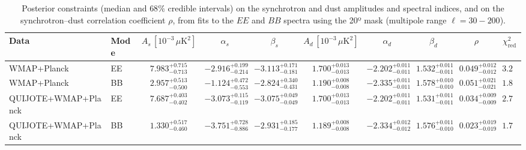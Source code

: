 \begin{table}[h]
\centering
\scriptsize
\setlength{\tabcolsep}{4pt}
\caption{Posterior constraints (median and $68\%$ credible intervals) on the synchrotron and dust amplitudes and spectral indices, and on the synchrotron--dust correlation coefficient $\rho$, from fits to the $EE$ and $BB$ spectra using the 20º mask (multipole range $\ell=30-200$).}
\label{tab:fit_results}
\begin{tabular}{llcccccccc}
\toprule
Data & Mode & $A_s\,[10^{-3}\,\mu\mathrm{K}^2]$ & $\alpha_s$ & $\beta_s$ & $A_d\,[10^{-3}\,\mu\mathrm{K}^2]$ & $\alpha_d$ & $\beta_d$ & $\rho$ & $\chi^2_\mathrm{red}$ \\
\midrule
WMAP+Planck & EE & $7.983^{+0.715}_{-0.713}$ & $-2.916^{+0.199}_{-0.214}$ & $-3.113^{+0.171}_{-0.181}$ & $1.700^{+0.013}_{-0.013}$ & $-2.202^{+0.011}_{-0.011}$ & $1.532^{+0.011}_{-0.011}$ & $0.049^{+0.012}_{-0.012}$ & $3.20$ \\
WMAP+Planck & BB & $2.957^{+0.513}_{-0.500}$ & $-1.124^{+0.472}_{-0.553}$ & $-2.824^{+0.340}_{-0.431}$ & $1.190^{+0.008}_{-0.008}$ & $-2.335^{+0.011}_{-0.011}$ & $1.578^{+0.010}_{-0.010}$ & $0.051^{+0.021}_{-0.021}$ & $1.86$ \\
QUIJOTE+WMAP+Planck & EE & $7.687^{+0.403}_{-0.402}$ & $-3.073^{+0.115}_{-0.119}$ & $-3.075^{+0.049}_{-0.049}$ & $1.700^{+0.013}_{-0.013}$ & $-2.202^{+0.011}_{-0.011}$ & $1.531^{+0.011}_{-0.011}$ & $0.034^{+0.009}_{-0.009}$ & $2.75$ \\
QUIJOTE+WMAP+Planck & BB & $1.330^{+0.517}_{-0.460}$ & $-3.751^{+0.728}_{-0.886}$ & $-2.931^{+0.185}_{-0.177}$ & $1.189^{+0.008}_{-0.008}$ & $-2.334^{+0.012}_{-0.012}$ & $1.576^{+0.011}_{-0.010}$ & $0.023^{+0.019}_{-0.019}$ & $1.74$ \\
\bottomrule
\end{tabular}
\end{table}
